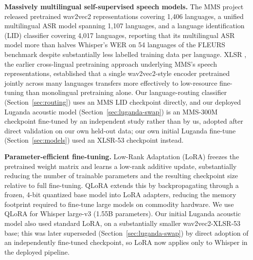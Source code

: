 \documentclass[11pt]{article}
\begin{document}
\textbf{Massively multilingual self-supervised speech models.} The MMS project \cite{pratap2024mms} released pretrained wav2vec2 representations covering 1{,}406 languages, a unified multilingual ASR model spanning 1{,}107 languages, and a language identification (LID) classifier covering 4{,}017 languages, reporting that its multilingual ASR model more than halves Whisper's WER on 54 languages of the FLEURS benchmark despite substantially less labelled training data per language. XLSR \cite{conneau2021xlsr}, the earlier cross-lingual pretraining approach underlying MMS's speech representations, established that a single wav2vec2-style encoder pretrained jointly across many languages transfers more effectively to low-resource fine-tuning than monolingual pretraining alone. Our language-routing classifier (Section~\ref{sec:routing}) uses an MMS LID checkpoint directly, and our deployed Luganda acoustic model (Section~\ref{sec:luganda-swap}) is an MMS-300M checkpoint fine-tuned by an independent study rather than by us, adopted after direct validation on our own held-out data; our own initial Luganda fine-tune (Section~\ref{sec:models}) used an XLSR-53 checkpoint instead.

\textbf{Parameter-efficient fine-tuning.} Low-Rank Adaptation (LoRA) \cite{hu2022lora} freezes the pretrained weight matrix and learns a low-rank additive update, substantially reducing the number of trainable parameters and the resulting checkpoint size relative to full fine-tuning. QLoRA \cite{dettmers2023qlora} extends this by backpropagating through a frozen, 4-bit quantized base model into LoRA adapters, reducing the memory footprint required to fine-tune large models on commodity hardware. We use QLoRA for Whisper large-v3 (1.55B parameters). Our initial Luganda acoustic model also used standard LoRA, on a substantially smaller wav2vec2-XLSR-53 base; this was later superseded (Section~\ref{sec:luganda-swap}) by direct adoption of an independently fine-tuned checkpoint, so LoRA now applies only to Whisper in the deployed pipeline.
\end{document}
